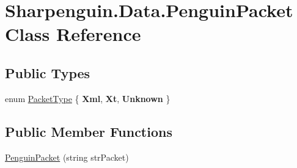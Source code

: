 \hypertarget{classSharpenguin_1_1Data_1_1PenguinPacket}{\section{\-Sharpenguin.\-Data.\-Penguin\-Packet \-Class \-Reference}
\label{classSharpenguin_1_1Data_1_1PenguinPacket}
}
\subsection*{\-Public \-Types}
\begin{DoxyCompactItemize}
\item 
enum \hyperlink{classSharpenguin_1_1Data_1_1PenguinPacket_ad526acc6fc64aa52d0a2f13dc9afb111}{\-Packet\-Type} \{ {\bfseries \-Xml}, 
{\bfseries \-Xt}, 
{\bfseries \-Unknown}
 \}
\end{DoxyCompactItemize}
\subsection*{\-Public \-Member \-Functions}
\begin{DoxyCompactItemize}
\item 
\hyperlink{classSharpenguin_1_1Data_1_1PenguinPacket_af167a2ed27d9cd6aeb506f6386b3ab99}{\-Penguin\-Packet} (string str\-Packet)
\end{DoxyCompactItemize}
